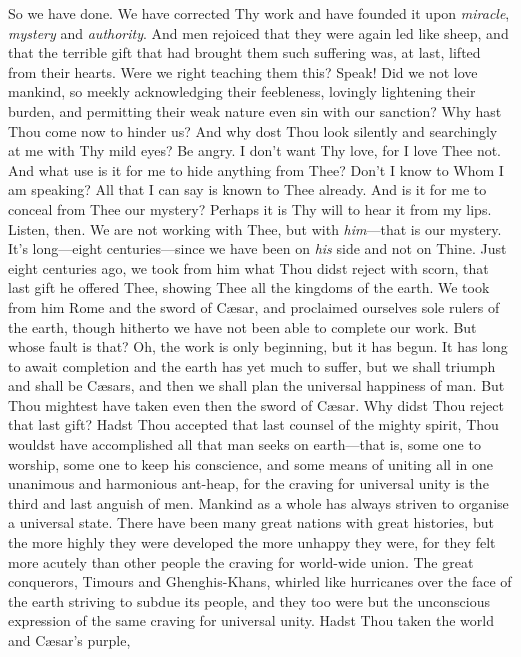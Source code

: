 So we have done. We have corrected Thy work and have founded it upon
\textit{miracle}, \textit{mystery} and \textit{authority}. And men
rejoiced that they were again led like sheep, and that the terrible
gift that had brought them such suffering was, at last, lifted from
their hearts. Were we right teaching them this? Speak! Did we not love
mankind, so meekly acknowledging their feebleness, lovingly lightening
their burden, and permitting their weak nature even sin with our
sanction? Why hast Thou come now to hinder us? And why dost Thou look
silently and searchingly at me with Thy mild eyes? Be angry. I don't
want Thy love, for I love Thee not. And what use is it for me to hide
anything from Thee? Don't I know to Whom I am speaking? All that I can
say is known to Thee already. And is it for me to conceal from Thee
our mystery? Perhaps it is Thy will to hear it from my lips. Listen,
then. We are not working with Thee, but with \textit{him}---that is
our mystery. It's long---eight cen\-tu\-ries---since we have been on
\textit{his} side and not on Thine. Just eight centuries ago, we took
from him what Thou didst reject with scorn, that last gift he offered
Thee, showing Thee all the kingdoms of the earth. We took from him
Rome and the sword of C\ae sar, and proclaimed ourselves sole rulers
of the earth, though hitherto we have not been able to complete our
work. But whose fault is that? Oh, the work is only beginning, but it
has begun. It has long to await completion and the earth has yet much
to suffer, but we shall triumph and shall be C\ae sars, and then we
shall plan the universal happiness of man. But Thou mightest have
taken even then the sword of C\ae sar. Why didst Thou reject that last
gift? Hadst Thou accepted that last counsel of the mighty spirit, Thou
wouldst have accomplished all that man seeks on earth---that is, some
one to worship, some one to keep his conscience, and some means of
uniting all in one unanimous and harmonious ant-heap, for the craving
for universal unity is the third and last anguish of men. Mankind as a
whole has always striven to organise a universal state. There have
been many great nations with great histories, but the more highly they
were developed the more unhappy they were, for  they felt
more acutely than other people the craving for world-wide union. The
great conquerors, Timours and Ghenghis-Khans, whirled like hurricanes
over the face of the earth striving to subdue its people, and they
too were but the unconscious expression of the same craving for
universal unity. Hadst Thou taken the world and C\ae sar's purple,
